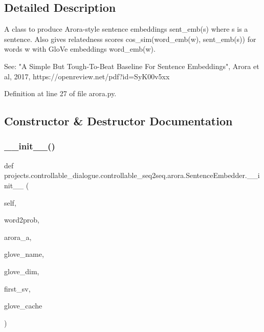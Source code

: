 \subsection{Detailed Description}
\begin{DoxyVerb}A class to produce Arora-style sentence embeddings sent_emb(s) where s is a
sentence. Also gives relatedness scores cos_sim(word_emb(w), sent_emb(s)) for words
w with GloVe embeddings word_emb(w).

See: "A Simple But Tough-To-Beat Baseline For Sentence Embeddings",
Arora et al, 2017, https://openreview.net/pdf?id=SyK00v5xx
\end{DoxyVerb}
 

Definition at line 27 of file arora.\+py.



\subsection{Constructor \& Destructor Documentation}
\mbox{\label{classprojects_1_1controllable__dialogue_1_1controllable__seq2seq_1_1arora_1_1SentenceEmbedder_a13f8aaf805cdc6f2f875855aebed359f}} 
\subsubsection{\texorpdfstring{\+\_\+\+\_\+init\+\_\+\+\_\+()}{\_\_init\_\_()}}
{\footnotesize\ttfamily def projects.\+controllable\+\_\+dialogue.\+controllable\+\_\+seq2seq.\+arora.\+Sentence\+Embedder.\+\_\+\+\_\+init\+\_\+\+\_\+ (\begin{DoxyParamCaption}\item[{}]{self,  }\item[{}]{word2prob,  }\item[{}]{arora\+\_\+a,  }\item[{}]{glove\+\_\+name,  }\item[{}]{glove\+\_\+dim,  }\item[{}]{first\+\_\+sv,  }\item[{}]{glove\+\_\+cache }\end{DoxyParamCaption})}

